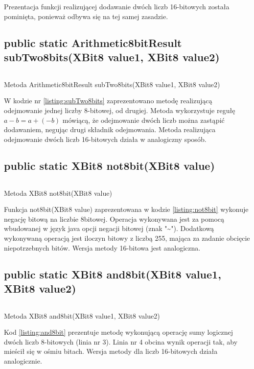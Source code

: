 Prezentacja funkcji realizującej dodawanie dwóch liczb 16-bitowych została pominięta, ponieważ odbywa się na tej samej zasadzie.

\subsection{public static Arithmetic8bitResult subTwo8bits(XBit8 value1, XBit8 value2)}
\begin{listing}[h]
	\inputminted{java}{listings/xbit/subTwo8bits.java}
	\caption{Metoda Arithmetic8bitResult subTwo8bits(XBit8 value1, XBit8 value2)}
	\label{listing:subTwo8bits}
\end{listing}
W kodzie nr \ref{listing:subTwo8bits} zaprezentowano metodę realizującą odejmowanie jednej liczby 8-bitowej, od drugiej. Metoda wykorzystuje regułę 
$ a - b = a+(-b) $ mówiącą, że odejmowanie dwóch liczb można zastąpić dodawaniem, negując drugi składnik odejmowania. 
Metoda realizująca odejmowanie dwóch liczb 16-bitowych działa w analogiczny sposób.

\subsection{public static XBit8 not8bit(XBit8 value)}
\begin{listing}[h]
	\inputminted{java}{listings/xbit/not8bit.java}
	\caption{Metoda XBit8 not8bit(XBit8 value)}
	\label{listing:not8bit}
\end{listing}
Funkcja not8bit(XBit8 value) zaprezentowana w kodzie \ref{listing:not8bit} wykonuje negację bitową na liczbie 8bitowej. Operacja wykonywana jest za pomocą wbudowanej w język java opcji negacji bitowej (znak "\~{}"). Dodatkową wykonywaną operacją jest iloczyn bitowy z liczbą 255, mająca za zadanie obcięcie niepotrzebnych bitów. Wersja metody 16-bitowa jest analogiczna.

\subsection{public static XBit8 and8bit(XBit8 value1, XBit8 value2)}
\begin{listing}[h]
	\inputminted{java}{listings/xbit/and8bit.java}
	\caption{Metoda XBit8 and8bit(XBit8 value1, XBit8 value2)}
	\label{listing:and8bit}
\end{listing}
Kod \ref{listing:and8bit} prezentuje metodę wykonującą operację sumy logicznej dwóch liczb 8-bitowych (linia nr 3). Linia nr 4 obcina wynik operacji tak, aby mieścił się w ośmiu bitach. Wersja metody dla liczb 16-bitowych działa analogicznie.

